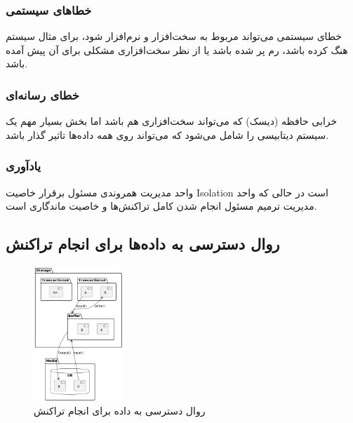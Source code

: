\subsubsection{خطا‌های سیستمی}

خطای سیستمی می‌تواند مربوط به سخت‌افزار و نرم‌افزار شود، برای مثال سیستم هنگ
کرده باشد، رم پر شده باشد یا از نظر سخت‌افزاری مشکلی برای آن پیش آمده باشد.

\subsubsection{خطای رسانه‌ای}

خرابی حافظه (دیسک) که می‌تواند سخت‌افزاری هم باشد اما بخش بسیار مهم یک سیستم
دیتابیسی را شامل می‌شود که می‌تواند روی همه داده‌ها تاثیر گذار باشد.

\subsubsection*{یادآوری}

واحد مدیریت همروندی مسئول برقرار خاصیت Isolation است در حالی که واحد مدیریت
ترمیم مسئول انجام شدن کامل تراکنش‌ها و خاصیت ماندگاری است.

\subsection{روال دسترسی به داده‌ها برای انجام تراکنش}





\begin{figure}
    \centering
    \includegraphics[width=0.3\textwidth]{umls/media.png}
    \caption{روال دسترسی به داده برای انجام تراکنش}
    \label{fig:media}
\end{figure}

